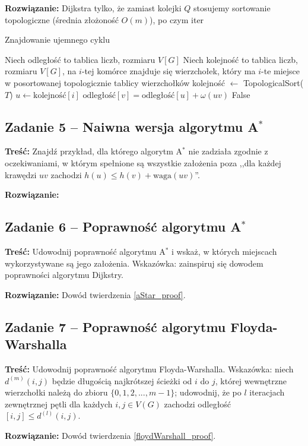 \textbf{Rozwiązanie: }
Dijkstra tylko, że zamiast kolejki $Q$ stosujemy
sortowanie topologiczne (średnia złożoność $O(m)$), 
po czym iter %
\begin{algorithm}[H]
	\caption{Znajdowanie ujemnego cyklu}
	\begin{algorithmic}[1]
		\State Niech odległość to tablica liczb, rozmiaru $V[G]$
		\State Niech kolejność to tablica liczb, rozmiaru $V[G]$, na
		$i$-tej komórce znajduje się wierzchołek, który ma 
		$i$-te miejsce w posortowanej topologicznie tablicy wierzchołków
		\State kolejność $\gets$ TopologicalSort($T$)
		\State $u \gets \text{kolejność}[i]$
		\State $\text{odległość}[v] = \text{odległość}[u] + \omega(uv)$
		\EndIf
		\EndFor 
		\EndFor
		\State \Return False
		\EndProcedure
	\end{algorithmic}
	\label{Zadanie34}
\end{algorithm}

\subsection{Zadanie 5 -- Naiwna wersja algorytmu A\texorpdfstring{$^*$}{TEXT}}
\textbf{Treść: } Znajdź przykład, dla 
którego algorytm A$^*$ nie zadziała zgodnie z oczekiwaniami, 
w którym spełnione
są wszystkie założenia 
poza 
,,dla każdej krawędzi $uv$ zachodzi $h(u) \leq h(v) + \text{waga}(uv)$''.

\textbf{Rozwiązanie: }

\subsection{Zadanie 6 -- Poprawność algorytmu A\texorpdfstring{$^*$}{TEXT}}
\textbf{Treść: } Udowodnij poprawność algorytmu 
A$^*$ i wskaż, w których miejscach wykorzystywane są jego założenia.
Wskazówka: zainspiruj się dowodem poprawności algorytmu Dijkstry.

\textbf{Rozwiązanie: } Dowód twierdzenia \ref{aStar_proof}.

\subsection{Zadanie 7 -- Poprawność algorytmu Floyda-Warshalla}
\textbf{Treść:} Udowodnij poprawność algorytmu Floyda-Warshalla. 
Wskazówka: niech 
$d^{(m)}(i, j)$ będzie długością
najkrótszej ścieżki od $i$ do $j$, której wewnętrzne wierzchołki należą
do zbioru $\{0, 1, 2, . . . , m - 1\}$; 
udowodnij, że po $l$
iteracjach zewnętrznej pętli dla każdych $i, j \in V (G)$ zachodzi 
odległość$[i, j] \leq d^{(l)}(i, j)$.

\textbf{Rozwiązanie:} Dowód twierdzenia \ref{floydWarshall_proof}.
